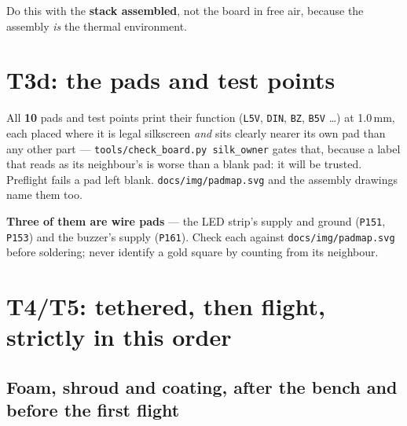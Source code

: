 \documentclass[11pt,a4paper]{article}
\newcommand{\file}[1]{\texttt{\small #1}}
\newcommand{\flag}[1]{\textcolor{warnred}{\textbf{#1}}}
\begin{document}
Do this with the \textbf{stack assembled}, not the board in free air, because the assembly
\emph{is} the thermal environment.

\section{T3d: the pads and test points}
\label{sec:T3d}

All \textbf{10} pads and test points print their function (\file{L5V}, \file{DIN}, \file{BZ},
\file{B5V} \dots) at 1.0\,mm, each placed where it is legal silkscreen \emph{and} sits clearly
nearer its own pad than any other part --- \file{tools/check\_board.py silk\_owner} gates
that, because a label that reads as its neighbour's is worse than a blank pad: it will be
trusted. Preflight fails a pad left blank. \file{docs/img/padmap.svg} and the assembly
drawings name them too.

\flag{Three of them are wire pads} --- the LED strip's supply and ground (\file{P151},
\file{P153}) and the buzzer's supply (\file{P161}). Check each against
\file{docs/img/padmap.svg} before soldering; never identify a gold square by counting from
its neighbour.

\section{T4/T5: tethered, then flight, strictly in this order}

\subsection{Foam, shroud and coating, after the bench and before the first flight}
\end{document}
